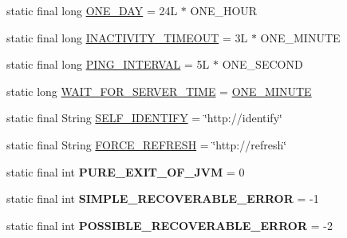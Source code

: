 \begin{DoxyCompactItemize}
\item 
static final long \hyperlink{classgov_1_1fnal_1_1ppd_1_1dd_1_1GlobalVariables_aef5cbdf53c9830ae609987b805a08998}{O\-N\-E\-\_\-\-D\-A\-Y} = 24\-L $\ast$ O\-N\-E\-\_\-\-H\-O\-U\-R
\item 
static final long \hyperlink{classgov_1_1fnal_1_1ppd_1_1dd_1_1GlobalVariables_ab33d116e6a83d46d778ee5c3521a39a4}{I\-N\-A\-C\-T\-I\-V\-I\-T\-Y\-\_\-\-T\-I\-M\-E\-O\-U\-T} = 3\-L $\ast$ O\-N\-E\-\_\-\-M\-I\-N\-U\-T\-E
\item 
static final long \hyperlink{classgov_1_1fnal_1_1ppd_1_1dd_1_1GlobalVariables_ac2e535e1d551e5eae9749ad1ff4eeccf}{P\-I\-N\-G\-\_\-\-I\-N\-T\-E\-R\-V\-A\-L} = 5\-L $\ast$ O\-N\-E\-\_\-\-S\-E\-C\-O\-N\-D
\item 
static long \hyperlink{classgov_1_1fnal_1_1ppd_1_1dd_1_1GlobalVariables_ab1fa16703a549d62b7ceaf50f6beb881}{W\-A\-I\-T\-\_\-\-F\-O\-R\-\_\-\-S\-E\-R\-V\-E\-R\-\_\-\-T\-I\-M\-E} = \hyperlink{classgov_1_1fnal_1_1ppd_1_1dd_1_1GlobalVariables_a79fc1e35198b44168537a85aa4c2d942}{O\-N\-E\-\_\-\-M\-I\-N\-U\-T\-E}
\item 
static final String \hyperlink{classgov_1_1fnal_1_1ppd_1_1dd_1_1GlobalVariables_aaaf6fe49f89ce39ddba1fac773161acf}{S\-E\-L\-F\-\_\-\-I\-D\-E\-N\-T\-I\-F\-Y} = \char`\"{}http\-://identify\char`\"{}
\item 
static final String \hyperlink{classgov_1_1fnal_1_1ppd_1_1dd_1_1GlobalVariables_a79c44481889ff937b51e30d13d9c1c35}{F\-O\-R\-C\-E\-\_\-\-R\-E\-F\-R\-E\-S\-H} = \char`\"{}http\-://refresh\char`\"{}
\item 
\hypertarget{classgov_1_1fnal_1_1ppd_1_1dd_1_1GlobalVariables_a9a5a3b99227fe4929fc0c3c664a922da}{static final int {\bfseries P\-U\-R\-E\-\_\-\-E\-X\-I\-T\-\_\-\-O\-F\-\_\-\-J\-V\-M} = 0}\label{classgov_1_1fnal_1_1ppd_1_1dd_1_1GlobalVariables_a9a5a3b99227fe4929fc0c3c664a922da}

\item 
\hypertarget{classgov_1_1fnal_1_1ppd_1_1dd_1_1GlobalVariables_aa1eece63cce68ac0186379fc2fa2272a}{static final int {\bfseries S\-I\-M\-P\-L\-E\-\_\-\-R\-E\-C\-O\-V\-E\-R\-A\-B\-L\-E\-\_\-\-E\-R\-R\-O\-R} = -\/1}\label{classgov_1_1fnal_1_1ppd_1_1dd_1_1GlobalVariables_aa1eece63cce68ac0186379fc2fa2272a}

\item 
\hypertarget{classgov_1_1fnal_1_1ppd_1_1dd_1_1GlobalVariables_a9e5673ef7b6da85febe9775aebc9504c}{static final int {\bfseries P\-O\-S\-S\-I\-B\-L\-E\-\_\-\-R\-E\-C\-O\-V\-E\-R\-A\-B\-L\-E\-\_\-\-E\-R\-R\-O\-R} = -\/2}\label{classgov_1_1fnal_1_1ppd_1_1dd_1_1GlobalVariables_a9e5673ef7b6da85febe9775aebc9504c}


\end{DoxyCompactItemize}
